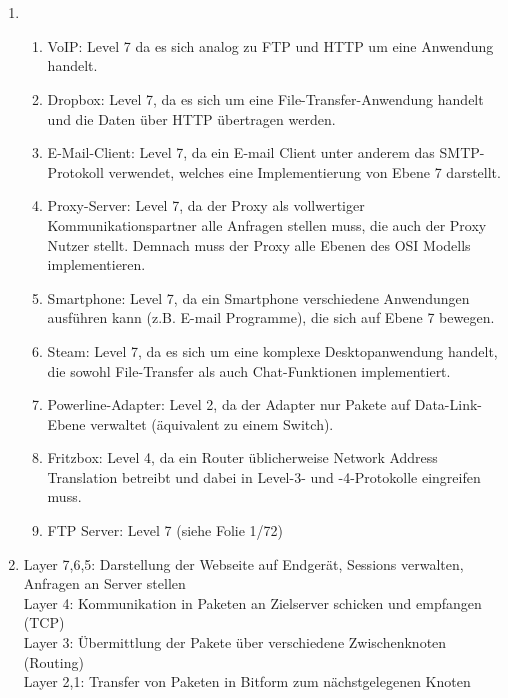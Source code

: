 \documentclass[a4paper,
			llpt,
			solution,
			accentcolor=tud2d,
			colorbacktitle
			]
			{tudexercise}
\begin{document}
\section{}
\begin{enumerate}
\item
\begin{enumerate}

\item
VoIP:
Level 7 da es sich analog zu FTP und HTTP um eine Anwendung handelt.

\item
Dropbox:
Level 7, da es sich um eine File-Transfer-Anwendung handelt und die Daten über HTTP übertragen werden.

\item
E-Mail-Client:
Level 7, da ein E-mail Client unter anderem das SMTP-Protokoll verwendet, welches eine Implementierung von Ebene 7 darstellt.

\item
Proxy-Server:
Level 7, da der Proxy als vollwertiger Kommunikationspartner alle Anfragen stellen muss, die auch der Proxy Nutzer stellt. Demnach muss der Proxy alle Ebenen des OSI Modells implementieren.

\item
Smartphone:
Level 7, da ein Smartphone verschiedene Anwendungen ausführen kann (z.B. E-mail Programme), die sich auf Ebene 7 bewegen.

\item
Steam:
Level 7, da es sich um eine komplexe Desktopanwendung handelt, die sowohl File-Transfer als auch Chat-Funktionen implementiert.

\item
Powerline-Adapter:
Level 2, da der Adapter nur Pakete auf Data-Link-Ebene verwaltet (äquivalent zu einem Switch).

\item
Fritzbox:
Level 4, da ein Router üblicherweise Network Address Translation betreibt und dabei in Level-3- und -4-Protokolle eingreifen muss.

\item
FTP Server:
Level 7 (siehe Folie 1/72)
\end{enumerate}
\item

Layer 7,6,5: Darstellung der Webseite auf Endgerät, Sessions verwalten, Anfragen an Server stellen
\\
Layer 4: Kommunikation in Paketen an Zielserver schicken und empfangen (TCP)
\\
Layer 3: Übermittlung der Pakete über verschiedene Zwischenknoten (Routing)
\\
Layer 2,1: Transfer von Paketen in Bitform zum nächstgelegenen Knoten


\end{enumerate}
\end{document}
